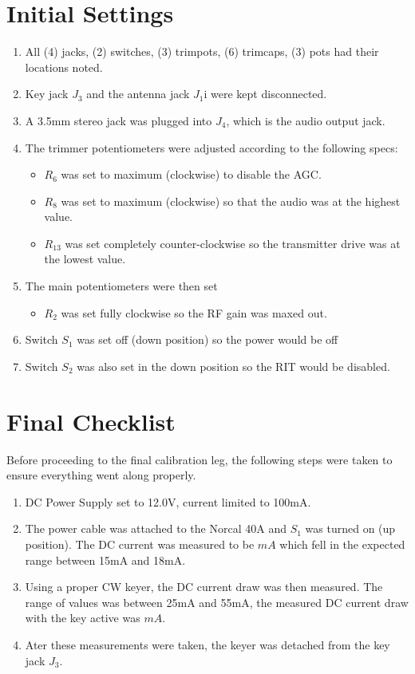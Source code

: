 \documentclass{./cls/hw}
\begin{document}
\section{Initial Settings}
  \begin{enumerate}
    \item All (4) jacks, (2) switches, (3) trimpots, (6) trimcaps, (3) pots had
      their locations noted.
    \item Key jack $J_3$ and the antenna jack $J_1$i were kept disconnected.
    \item A 3.5mm stereo jack was plugged into $J_4$, which is the audio output
      jack.
    \item The trimmer potentiometers were adjusted according to the following specs:
      \begin{itemize}
        \item $R_6$ was set to maximum (clockwise) to disable the AGC.
        \item $R_8$ was set to maximum (clockwise) so that the audio was at the highest
          value.
        \item $R_{13}$ was set completely counter-clockwise so the transmitter
          drive was at the lowest value.
      \end{itemize}
    \item The main potentiometers were then set
      \begin{itemize}
          \item $R_2$ was set fully clockwise so the RF gain was maxed out.
      \end{itemize}
    \item Switch $S_1$ was set off (down position) so the power would be off
    \item Switch $S_2$ was also set in the down position so the RIT would be
      disabled.
  \end{enumerate}
\section{Final Checklist}
Before proceeding to the final calibration leg, the following steps were taken
to ensure everything went along properly.
\begin{enumerate}
  \item DC Power Supply set to 12.0V, current limited to 100mA.
  \item The power cable was attached to the Norcal 40A and $S_1$ was turned on
    (up position). The DC current was measured to be $\boxed{mA}$ which fell in the
    expected range between 15mA and 18mA.
  \item Using a proper CW keyer, the DC current draw was then measured. The
    range of values was between 25mA and 55mA, the measured DC current draw
    with the key active was $\boxed{mA}$.
  \item Ater these measurements were taken, the keyer was detached from the key
    jack $J_3$.
\end{enumerate}
\end{document}
